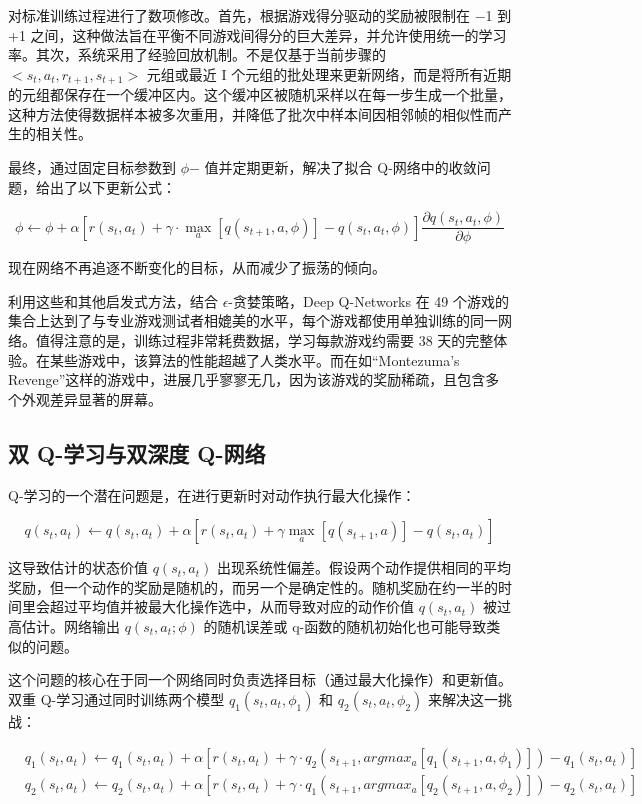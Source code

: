 对标准训练过程进行了数项修改。首先，根据游戏得分驱动的奖励被限制在 −1 到 +1 之间，这种做法旨在平衡不同游戏间得分的巨大差异，并允许使用统一的学习率。其次，系统采用了经验回放机制。不是仅基于当前步骤的 \(<s_t, a_t, r_{t+1}, s_{t+1}>\) 元组或最近 I 个元组的批处理来更新网络，而是将所有近期的元组都保存在一个缓冲区内。这个缓冲区被随机采样以在每一步生成一个批量，这种方法使得数据样本被多次重用，并降低了批次中样本间因相邻帧的相似性而产生的相关性。

最终，通过固定目标参数到 \(\phi\)− 值并定期更新，解决了拟合 Q-网络中的收敛问题，给出了以下更新公式：

\[
\phi \leftarrow \phi + \alpha \left[ r(s_t, a_t) + \gamma \cdot \max_a [q(s_{t+1}, a, \phi)] - q(s_t, a_t, \phi) \right] \frac{\partial q(s_t, a_t, \phi)}{\partial \phi} \tag{19.18}
\]


现在网络不再追逐不断变化的目标，从而减少了振荡的倾向。

利用这些和其他启发式方法，结合 \(\epsilon\)-贪婪策略，Deep Q-Networks 在 49 个游戏的集合上达到了与专业游戏测试者相媲美的水平，每个游戏都使用单独训练的同一网络。值得注意的是，训练过程非常耗费数据，学习每款游戏约需要 38 天的完整体验。在某些游戏中，该算法的性能超越了人类水平。而在如“Montezuma's Revenge”这样的游戏中，进展几乎寥寥无几，因为该游戏的奖励稀疏，且包含多个外观差异显著的屏幕。

\subsection{双 Q-学习与双深度 Q-网络}
Q-学习的一个潜在问题是，在进行更新时对动作执行最大化操作：

\[
q(s_t, a_t) \leftarrow q(s_t, a_t) + \alpha \left[ r(s_t, a_t) + \gamma \max_{a} [q(s_{t+1}, a)] - q(s_t, a_t) \right] \tag{19.19}
\]

这导致估计的状态价值 \(q(s_t, a_t)\) 出现系统性偏差。假设两个动作提供相同的平均奖励，但一个动作的奖励是随机的，而另一个是确定性的。随机奖励在约一半的时间里会超过平均值并被最大化操作选中，从而导致对应的动作价值 \(q(s_t, a_t)\) 被过高估计。网络输出 \(q(s_t, a_t; \phi)\) 的随机误差或 q-函数的随机初始化也可能导致类似的问题。

这个问题的核心在于同一个网络同时负责选择目标（通过最大化操作）和更新值。双重 Q-学习通过同时训练两个模型 \(q_1(s_t, a_t, \phi_1)\) 和 \(q_2(s_t, a_t, \phi_2)\) 来解决这一挑战：


\begin{align}
&q_1(s_t, a_t) \leftarrow q_1(s_t, a_t) + \alpha \left[ r(s_t, a_t) + \gamma \cdot q_2 \left( s_{t+1}, argmax_{a} [q_1(s_{t+1}, a, \phi_1)] \right) - q_1(s_t, a_t) \right] \\
&q_2(s_t, a_t) \leftarrow q_2(s_t, a_t) + \alpha \left[ r(s_t, a_t) + \gamma \cdot q_1 \left( s_{t+1}, argmax_{a} [q_2(s_{t+1}, a, \phi_2)] \right) - q_2(s_t, a_t) \right] \tag{19.20}
\end{align} 



